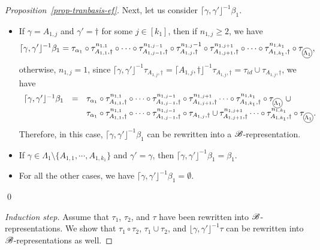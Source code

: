 \begin{proof}[Proposition~\ref{prop-tranbasis-ef}]
	Next, let us consider $\lceil \gamma, \gamma' \rfloor^{-1} \beta_1$. 
	\begin{itemize}
		\item If $\gamma = A_{1, j}$ and $\gamma' = \dag$ for some $j \in [k_1]$, then if $n_{1,j} \ge 2$, we have
		$$\lceil \gamma, \gamma' \rfloor^{-1} \beta_1 = \tau_{ \alpha_1} \circ \tau^{n_{1,1}}_{A_{1,1}, \dag} \circ \cdots \circ \tau^{n_{1,j-1}}_{A_{1,j-1}, \dag}  \circ \tau^{n_{1,j}-1}_{A_{1,j}, \dag}  \circ  \tau^{n_{1, j+1}}_{A_{1, j+1}, \dag}  \circ \cdots \circ \tau^{n_{1, k_1}}_{A_{1, k_1}, \dag} \circ \tau_{\mathcircled{\Lambda_1}},$$ 
		otherwise, $n_{1,j} = 1$, since $\lceil \gamma, \gamma' \rfloor^{-1} \tau_{A_{1,j}, \dag} = \lceil A_{1, j}, \dag \rfloor^{-1} \tau_{A_{1,j}, \dag} = \tau_{id} \cup \tau_{A_{1,j}, \dag}$,  we have
		$$
		\begin{array}{l c l}
		\lceil \gamma, \gamma' \rfloor^{-1} \beta_1 & = & \tau_{\alpha_1} \circ \tau^{n_{1,1}}_{A_{1,1}, \dag} \circ \cdots \circ \tau^{n_{1,j-1}}_{A_{1,j-1}, \dag}  \circ \tau^{n_{1,j+1}}_{A_{1,j+1}, \dag} \cdots \circ \tau^{n_{1, k_1}}_{A_{1, k_1}, \dag} \circ \tau_{\mathcircled{\Lambda_1}}\ \cup  \\ 
		& & \tau_{\alpha_1} \circ \tau^{n_{1,1}}_{A_{1,1}, \dag} \circ \cdots \circ \tau^{n_{1,j-1}}_{A_{1,j-1}, \dag}  \circ \tau_{A_{1,j}, \dag} \cup \tau^{n_{1,j+1}}_{A_{1,j+1}, \dag} \cdots \circ \tau^{n_{1, k_1}}_{A_{1, k_1}, \dag} \circ \tau_{\mathcircled{\Lambda_1}}.
		\end{array}
		$$
		Therefore, in this case, $\lceil \gamma, \gamma' \rfloor^{-1} \beta_1$ can be rewritten into a ${\mathscr{B} }$-representation.
		\item If $\gamma \in \Lambda_1 \setminus \{A_{1,1}, \cdots, A_{1, k_1}\}$ and $\gamma' = \gamma$, then $\lceil \gamma, \gamma' \rfloor^{-1} \beta_1 = \beta_1$. 
		\item For all the other cases, we have $\lceil \gamma, \gamma' \rfloor^{-1} \beta_1 = \emptyset$.
	\end{itemize}
	\qed
	
	\smallskip
	\noindent\emph{Induction step.} Assume that $\tau_1$, $\tau_2$, and $\tau$ have been rewritten into ${\mathscr{B} }$-representations. We show that $\tau_1 \circ \tau_2$, $\tau_1 \cup \tau_2$, and $\lfloor \gamma, \gamma' \rfloor^{-1} \tau$ can be rewritten into ${\mathscr{B} }$-representations as well.
	

\end{proof}
